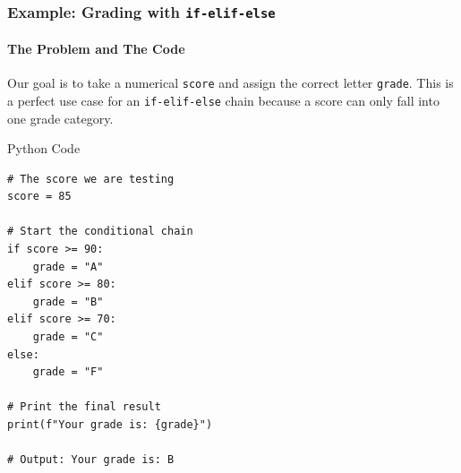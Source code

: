 \documentclass{beamer}
\begin{document}
\begin{frame}[fragile]
    \frametitle{Example: Grading with \texttt{if-elif-else}}
    \framesubtitle{The Problem and The Code}
    
    Our goal is to take a numerical \texttt{score} and assign the correct letter \texttt{grade}. This is a perfect use case for an \texttt{if-elif-else} chain because a score can only fall into one grade category.
    
    \vspace{1em}
    
    \begin{block}{Python Code}
\begin{verbatim}
# The score we are testing
score = 85

# Start the conditional chain
if score >= 90:
    grade = "A"
elif score >= 80:
    grade = "B"
elif score >= 70:
    grade = "C"
else:
    grade = "F"

# Print the final result
print(f"Your grade is: {grade}")

# Output: Your grade is: B
\end{verbatim}
    \end{block}
    
\end{frame}
\end{document}
